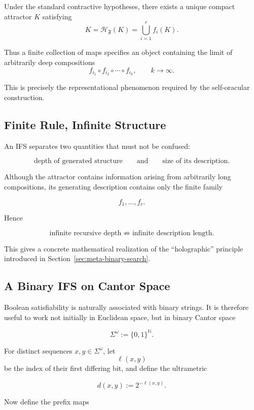 \documentclass[11pt]{article}
\theoremstyle{plain}
\theoremstyle{definition}
\begin{document}
Under the standard contractive hypotheses, there exists a unique compact
attractor \(K\) satisfying
\[
    \boxed{
    K
    =
    \mathcal{H}_{\mathfrak{F}}(K)
    =
    \bigcup_{i=1}^{r} f_i(K).
    }
\]

Thus a finite collection of maps specifies an object containing the limit of
arbitrarily deep compositions
\[
    f_{i_1}\circ f_{i_2}\circ\cdots\circ f_{i_k},
    \qquad
    k\to\infty.
\]

This is precisely the representational phenomenon required by the
self-oracular construction.

\subsection{Finite Rule, Infinite Structure}

An IFS separates two quantities that must not be confused:

\[
    \text{depth of generated structure}
    \qquad\text{and}\qquad
    \text{size of its description}.
\]

Although the attractor contains information arising from arbitrarily long
compositions, its generating description contains only the finite family

\[
    f_1,\dots,f_r.
\]

Hence

\[
\boxed{
\text{infinite recursive depth}
\not\Rightarrow
\text{infinite description length}.
}
\]

This gives a concrete mathematical realization of the ``holographic''
principle introduced in Section~\ref{sec:meta-binary-search}.

\subsection{A Binary IFS on Cantor Space}

Boolean satisfiability is naturally associated with binary strings.  It is
therefore useful to work not initially in Euclidean space, but in binary
Cantor space

\[
    \Sigma^\omega
    :=
    \{0,1\}^{\mathbb{N}}.
\]

For distinct sequences \(x,y\in\Sigma^\omega\), let
\[
    \ell(x,y)
\]
be the index of their first differing bit, and define the ultrametric

\[
    d(x,y)
    :=
    2^{-\ell(x,y)}.
\]

Now define the prefix maps
\end{document}
